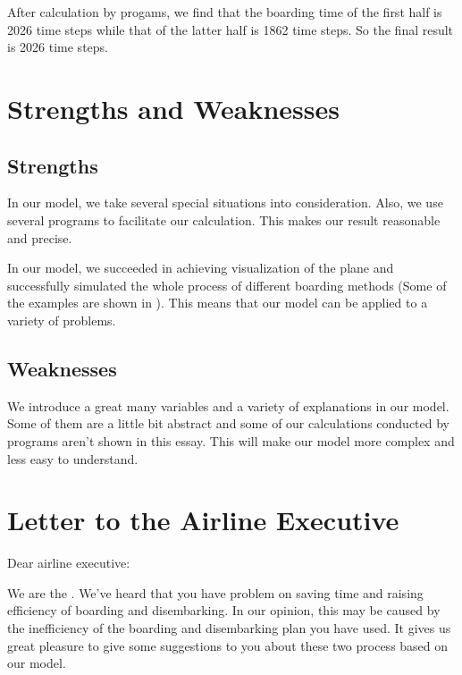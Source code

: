 \documentclass{article}
\theoremstyle{definition}
\theoremstyle{remark}
\numberwithin{equation}{section}
\begin{document}
	After calculation by progams, we find that the boarding time of the first half is 2026 time steps while that of the latter half is 1862 time steps. So the final result is 2026 time steps.
	\section{Strengths and Weaknesses}
	\subsection*{Strengths}
	\begin{itemize}
		
		In our model, we take several special situations into consideration. Also, we use several programs to facilitate our calculation. This makes our result reasonable and precise.
		
		In our model, we succeeded in achieving visualization of the plane and  successfully simulated the whole process of different boarding methods (Some of the examples are shown in ).  This means that our model can be applied to a variety of problems.
	\end{itemize}
	\subsection*{Weaknesses}
	\begin{itemize}
		\itembf{Complexity}
		
		We introduce a great many variables and a variety of explanations in our model. Some of them are a little bit abstract and some of our calculations conducted by programs aren't shown in this essay. This will make our model more complex and less easy to understand.
	\end{itemize}

	
	
	
	\newpage
	\section{Letter to the Airline Executive}
	\noindent Dear airline executive:

	We are the . We've heard that you have problem on saving time and raising efficiency of boarding and disembarking. In our opinion, this may be caused by the inefficiency of the boarding and disembarking plan you have used. It gives us great pleasure to give some suggestions to you  about these two process based on our model.
\end{document}
